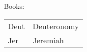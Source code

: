 \documentclass[10pt]{article}
\begin{document}
\begin{center}
\vspace{1em}
Books: \begin{tabular}{|l|l|} \hline
Deut & Deuteronomy \\
Jer & Jeremiah \\
   \hline
\end{tabular}
\begin{comment}
\begin{tabular}{|c|c|c|c|}\hline
{\bf People: } & & & \\
BL & Barry Langman &
MS & Magdalen Smith \\

\end{comment}
\end{center}
\end{document}
